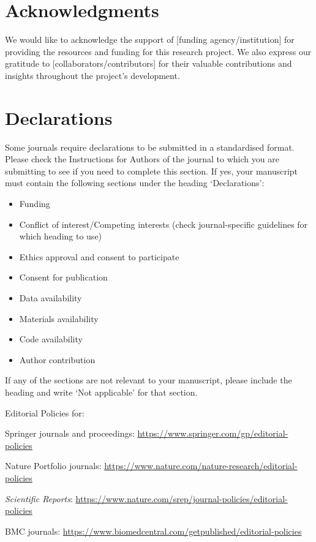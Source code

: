 \documentclass[pdflatex,sn-mathphys-num]{sn-jnl}%
\theoremstyle{thmstyleone}
\theoremstyle{thmstyletwo}%
\theoremstyle{thmstylethree}%
\begin{document}
\section*{Acknowledgments}
We would like to acknowledge the support of [funding agency/institution] for providing the resources and funding for this research project. We also express our gratitude to [collaborators/contributors] for their valuable contributions and insights throughout the project's development.


\section*{Declarations}

Some journals require declarations to be submitted in a standardised format. Please check the Instructions for Authors of the journal to which you are submitting to see if you need to complete this section. If yes, your manuscript must contain the following sections under the heading `Declarations':

\begin{itemize}
\item Funding
\item Conflict of interest/Competing interests (check journal-specific guidelines for which heading to use)
\item Ethics approval and consent to participate
\item Consent for publication
\item Data availability 
\item Materials availability
\item Code availability 
\item Author contribution
\end{itemize}

\noindent
If any of the sections are not relevant to your manuscript, please include the heading and write `Not applicable' for that section. 


\bigskip
\begin{flushleft}%
Editorial Policies for:

\bigskip\noindent
Springer journals and proceedings: \url{https://www.springer.com/gp/editorial-policies}

\bigskip\noindent
Nature Portfolio journals: \url{https://www.nature.com/nature-research/editorial-policies}

\bigskip\noindent
\textit{Scientific Reports}: \url{https://www.nature.com/srep/journal-policies/editorial-policies}

\bigskip\noindent
BMC journals: \url{https://www.biomedcentral.com/getpublished/editorial-policies}
\end{flushleft}
\end{document}
